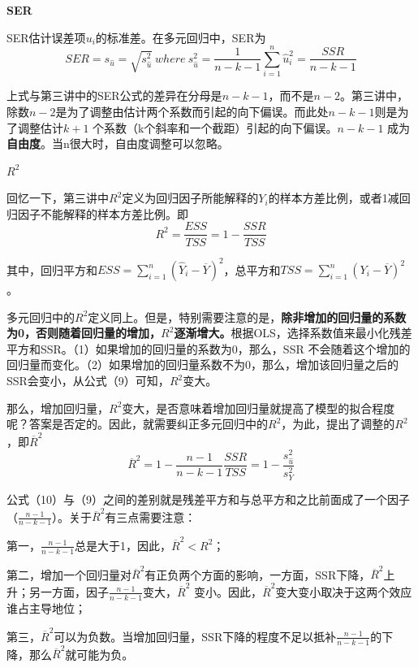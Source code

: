 \documentclass[cn,12pt,math=newtx,citestyle=gb7714-2015,bibstyle=gb7714-2015]{elegantbook}
\begin{document}
	\textbf{SER}
	
	SER估计误差项$u_i$的标准差。在多元回归中，SER为
	\begin{equation}
		SER=s_{\hat{u}}=\sqrt{s_{\hat{u}}^2}~where~s_{\hat{u}}^2=\frac{1}{n-k-1}\sum_{i=1}^{n}{\hat{u}_i^2}=\frac{SSR}{n-k-1}
	\end{equation}
	
	上式与第三讲中的SER公式的差异在分母是$n-k-1$，而不是$n-2$。第三讲中，除数$n-2$是为了调整由估计两个系数而引起的向下偏误。而此处$n-k-1$则是为了调整估计$k+1$ 个系数（k个斜率和一个截距）引起的向下偏误。$n-k-1$ 成为\textbf{自由度}。当n很大时，自由度调整可以忽略。
	
	\textbf{$R^2$}
	
	回忆一下，第三讲中$R^2$定义为回归因子所能解释的$Y_i$的样本方差比例，或者1减回归因子不能解释的样本方差比例。即
	\begin{equation}
		R^2=\frac{ESS}{TSS}=1-\frac{SSR}{TSS}
	\end{equation}
	
	其中，回归平方和$ESS=\sum_{i=1}^n{(\hat{Y}_i-\overline{Y})^2}$，总平方和$TSS=\sum_{i=1}^n{(Y_i-\overline{Y})^2}$。
	
	多元回归中的$R^2$定义同上。但是，特别需要注意的是，\textbf{除非增加的回归量的系数为0，否则随着回归量的增加，$R^2$逐渐增大。}根据OLS，选择系数值来最小化残差平方和SSR。（1）如果增加的回归量的系数为0，那么，SSR 不会随着这个增加的回归量而变化。（2）如果增加的回归量系数不为0，那么，增加该回归量之后的SSR会变小，从公式（9）可知，$R^2$变大。
	
	那么，增加回归量，$R^2$变大，是否意味着增加回归量就提高了模型的拟合程度呢？答案是否定的。因此，就需要纠正多元回归中的$R^2$，为此，提出了调整的$R^2$，即$\overline{R}^2$
	\begin{equation}
		\overline{R}^2=1-\frac{n-1}{n-k-1}\frac{SSR}{TSS}=1-\frac{s_{\hat{u}}^2}{s_Y^2}
	\end{equation}
	
	公式（10）与（9）之间的差别就是残差平方和与总平方和之比前面成了一个因子（$\frac{n-1}{n-k-1}$）。关于$\overline{R}^2$有三点需要注意：
	
	第一，$\frac{n-1}{n-k-1}$总是大于1，因此，$\overline{R}^2<R^2$；
	
	第二，增加一个回归量对$\overline{R}^2$有正负两个方面的影响，一方面，SSR下降，$\overline{R}^2$上升；另一方面，因子$\frac{n-1}{n-k-1}$变大，$\overline{R}^2$ 变小。因此，$\overline{R}^2$变大变小取决于这两个效应谁占主导地位；
	
	第三，$\overline{R}^2$可以为负数。当增加回归量，SSR下降的程度不足以抵补$\frac{n-1}{n-k-1}$的下降，那么$\overline{R}^2$就可能为负。
	
\end{document}
